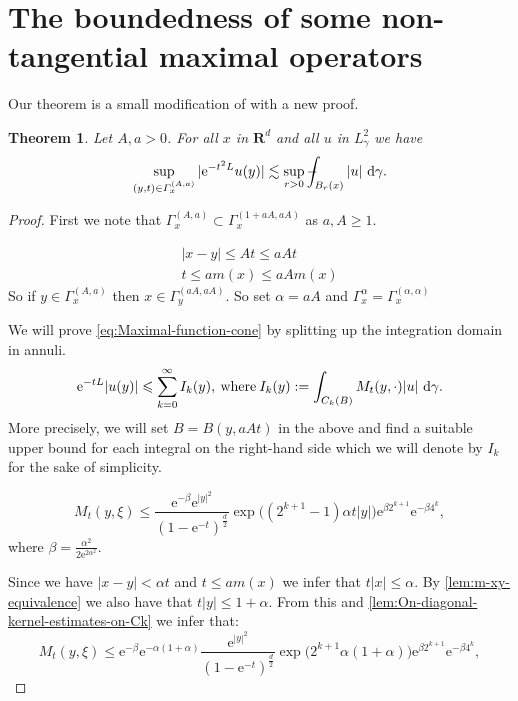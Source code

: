 \documentclass[a4paper,oneside,10pt]{amsproc}
\newtheorem{theorem}{Theorem}
\theoremstyle{remark}
\newcommand{\D}{\,\textup{d}}
\newcommand{\LHG}{{L^2_\gamma}}
\def\Xint#1{\mathchoice
  {\XXint\displaystyle\textstyle{#1}}%
  {\XXint\textstyle\scriptstyle{#1}}%
  {\XXint\scriptstyle\scriptscriptstyle{#1}}%
  {\XXint\scriptscriptstyle\scriptscriptstyle{#1}}%
  \!\int}
\def\XXint#1#2#3{{\setbox0=\hbox{$#1{#2#3}{\int}$ }
    \vcenter{\hbox{$#2#3$ }}\kern-.535\wd0}}
\def\dashint{\Xint-}
\renewcommand{\leq}{\leqslant}
\renewcommand{\leq}{\leqslant}
\renewcommand{\geq}{\geqslant}
\newcommand{\R}{\mathbf R}
\newcommand{\e}{\mathrm{e}} %
\renewcommand{\leq}{\leqslant}%
\renewcommand{\geq}{\geqslant}%
\begin{document}
\section{The boundedness of some non-tangential maximal operators}
Our theorem is a small modification of \cite[lemma 1.1]{Pineda2008} with a new proof.
\begin{theorem}\label{thm:Gaussian-maximal-function}
  Let $A, a > 0$. For all $x$ in $\R^d$ and all $u$ in $\LHG$ we have
  \begin{equation}
    \label{eq:Maximal-function-cone}
    \sup_{(y, t) \in \Gamma_x^{(A, a)}} |\e^{-t^2 L} u(y)| \lesssim
    \sup_{r > 0} \dashint_{B_r(x)} |u| \, \D\gamma.
  \end{equation}
\end{theorem}
\begin{proof}
  First we note that $\Gamma_x^{(A, a)} \subset \Gamma_x^{(1 + aA,
    aA)}$ as $a, A \geq 1$.

  \begin{align*}
    |x - y| \leq At \leq aA t\\
    t \leq a m(x) \leq aA m(x)
  \end{align*}
  So if $y \in \Gamma_x^{(A, a)}$ then $x \in \Gamma_y^{(aA, aA)}$. So
  set $\alpha = aA$ and $\Gamma_x^\alpha = \Gamma^{(\alpha, \alpha)}_x$


  We will prove \eqref{eq:Maximal-function-cone} by splitting up the
  integration domain in annuli.
  \begin{equation*}
    \e^{-t L} |u(y)| \leq \sum_{k = 0}^\infty I_k(y),
    \:\text{where}\: I_k(y) := \int_{C_k(B)} M_t(y, \cdot) |u|
    \,\D\gamma.
  \end{equation*}
  More precisely, we will set $B = B(y, aAt)$ in the above and find a
  suitable upper bound for each integral on the right-hand side which
  we will denote by $I_k$ for the sake of simplicity.


  \begin{equation*}
    M_t(y, \xi) \leq \frac{\e^{-\beta} \e^{|y|^2}}{(1 - \e^{-t})^{\frac{d}2}}
    \exp\bigl((2^{k + 1} - 1) \alpha t |y| \bigr) \e^{\beta 2^{k + 1}} \e^{-\beta 4^k},
  \end{equation*}
  where $\beta = \frac{\alpha^2}{2 \e^{2\alpha^2}}$.

  Since we have $|x - y| <  \alpha t$ and $t \leq a m(x)$ we infer that $t
  |x| \leq \alpha$. By \autoref{lem:m-xy-equivalence} we also have that $t
  |y| \leq 1 + \alpha$. From this and
  \autoref{lem:On-diagonal-kernel-estimates-on-Ck} we infer that:
  \begin{equation}
    \label{eq:Mehler-kernel-estimate-one-sided-bound-1}
    M_t(y, \xi) \leq \e^{-\beta} \e^{-\alpha(1 + \alpha)} \frac{\e^{|y|^2}}{(1 - \e^{-t})^{\frac{d}2}}
    \exp\bigl(2^{k + 1} \alpha (1 + \alpha) \bigr) \e^{\beta 2^{k + 1}} \e^{-\beta 4^k},
  \end{equation}


\end{proof}
\end{document}

